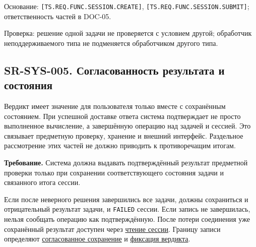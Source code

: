 \documentclass[12pt,a4paper]{article}
\begin{document}
Основание: \texttt{[TS.\allowbreak{}REQ.\allowbreak{}FUNC.\allowbreak{}SESSION.\allowbreak{}CREATE]}, \texttt{[TS.\allowbreak{}REQ.\allowbreak{}FUNC.\allowbreak{}SESSION.\allowbreak{}SUBMIT]}; ответственность частей в DOC-05.

Проверка: решение одной задачи не проверяется с условием другой; обработчик неподдерживаемого типа не подменяется обработчиком другого типа.

\subsection{SR-SYS-005. Согласованность результата и состояния}\label{sr-sys-005-ux441ux43eux433ux43bux430ux441ux43eux432ux430ux43dux43dux43eux441ux442ux44c-ux440ux435ux437ux443ux43bux44cux442ux430ux442ux430-ux438-ux441ux43eux441ux442ux43eux44fux43dux438ux44f}

\hypertarget{sr-sys-005-согласованность-результата-и-состояния}{}

Вердикт имеет значение для пользователя только вместе с сохранённым состоянием. При успешной доставке ответа система подтверждает не просто выполненное вычисление, а завершённую операцию над задачей и сессией. Это связывает предметную проверку, хранение и внешний интерфейс. Раздельное рассмотрение этих частей не должно приводить к противоречащим итогам.

\textbf{Требование.} Система должна выдавать подтверждённый результат предметной проверки только при сохранении соответствующего состояния задачи и связанного итога сессии.

Если после неверного решения завершились все задачи, должны сохраниться и отрицательный результат задачи, и \texttt{FAILED} сессии. Если запись не завершилась, нельзя сообщать операцию как подтверждённую. После потери соединения уже сохранённый результат доступен через \hyperref[sr-ses-014-ux43fux43eux43bux443ux447ux435ux43dux438ux435-ux441ux43eux445ux440ux430ux43dux451ux43dux43dux43eux433ux43e-ux440ux435ux437ux443ux43bux44cux442ux430ux442ux430]{чтение сессии}. Границу записи определяют \href{../07_\%D0\%9F\%D1\%80\%D0\%BE\%D0\%B3\%D1\%80\%D0\%B0\%D0\%BC\%D0\%BC\%D0\%BD\%D1\%8B\%D0\%B5_\%D1\%82\%D1\%80\%D0\%B5\%D0\%B1\%D0\%BE\%D0\%B2\%D0\%B0\%D0\%BD\%D0\%B8\%D1\%8F/DOC-06_\%D0\%9F\%D1\%80\%D0\%BE\%D0\%B3\%D1\%80\%D0\%B0\%D0\%BC\%D0\%BC\%D0\%BD\%D1\%8B\%D0\%B5_\%D1\%82\%D1\%80\%D0\%B5\%D0\%B1\%D0\%BE\%D0\%B2\%D0\%B0\%D0\%BD\%D0\%B8\%D1\%8F.pdf\#nameddest=swr-sys-005-\%D1\%81\%D0\%BE\%D0\%B3\%D0\%BB\%D0\%B0\%D1\%81\%D0\%BE\%D0\%B2\%D0\%B0\%D0\%BD\%D0\%BD\%D0\%BE\%D0\%B5-\%D1\%81\%D0\%BE\%D1\%85\%D1\%80\%D0\%B0\%D0\%BD\%D0\%B5\%D0\%BD\%D0\%B8\%D0\%B5}{согласованное сохранение} и \href{../07_\%D0\%9F\%D1\%80\%D0\%BE\%D0\%B3\%D1\%80\%D0\%B0\%D0\%BC\%D0\%BC\%D0\%BD\%D1\%8B\%D0\%B5_\%D1\%82\%D1\%80\%D0\%B5\%D0\%B1\%D0\%BE\%D0\%B2\%D0\%B0\%D0\%BD\%D0\%B8\%D1\%8F/DOC-06.2_\%D0\%A1\%D0\%B5\%D1\%81\%D1\%81\%D0\%B8\%D0\%B8_\%D0\%B7\%D0\%B0\%D0\%B4\%D0\%B0\%D1\%87_\%D0\%B8_\%D0\%BF\%D0\%BB\%D0\%B0\%D0\%BD\%D0\%B8\%D1\%80\%D0\%BE\%D0\%B2\%D1\%89\%D0\%B8\%D0\%BA.pdf\#nameddest=swr-ses-011-\%D1\%81\%D0\%BE\%D1\%85\%D1\%80\%D0\%B0\%D0\%BD\%D0\%B5\%D0\%BD\%D0\%B8\%D0\%B5-\%D0\%B2\%D0\%B5\%D1\%80\%D0\%B4\%D0\%B8\%D0\%BA\%D1\%82\%D0\%B0}{фиксация вердикта}.
\end{document}
